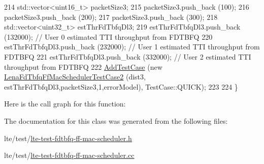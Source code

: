 \begin{DoxyCode}
214   std::vector<uint16\_t> packetSize3;
215   packetSize3.push\_back (100);
216   packetSize3.push\_back (200);
217   packetSize3.push\_back (300);
218   std::vector<uint32\_t> estThrFdTbfqDl3;
219   estThrFdTbfqDl3.push\_back (132000); \textcolor{comment}{// User 0 estimated TTI throughput from FDTBFQ}
220   estThrFdTbfqDl3.push\_back (232000); \textcolor{comment}{// User 1 estimated TTI throughput from FDTBFQ}
221   estThrFdTbfqDl3.push\_back (332000); \textcolor{comment}{// User 2 estimated TTI throughput from FDTBFQ}
222   \hyperlink{classns3_1_1TestCase_a3718088e3eefd5d6454569d2e0ddd835}{AddTestCase} (\textcolor{keyword}{new} \hyperlink{classLenaFdTbfqFfMacSchedulerTestCase2}{LenaFdTbfqFfMacSchedulerTestCase2} (dist3,
      estThrFdTbfqDl3,packetSize3,1,errorModel), TestCase::QUICK);
223 
224 \}
\end{DoxyCode}


Here is the call graph for this function\+:




The documentation for this class was generated from the following files\+:\begin{DoxyCompactItemize}
\item 
lte/test/\hyperlink{lte-test-fdtbfq-ff-mac-scheduler_8h}{lte-\/test-\/fdtbfq-\/ff-\/mac-\/scheduler.\+h}\item 
lte/test/\hyperlink{lte-test-fdtbfq-ff-mac-scheduler_8cc}{lte-\/test-\/fdtbfq-\/ff-\/mac-\/scheduler.\+cc}\end{DoxyCompactItemize}
